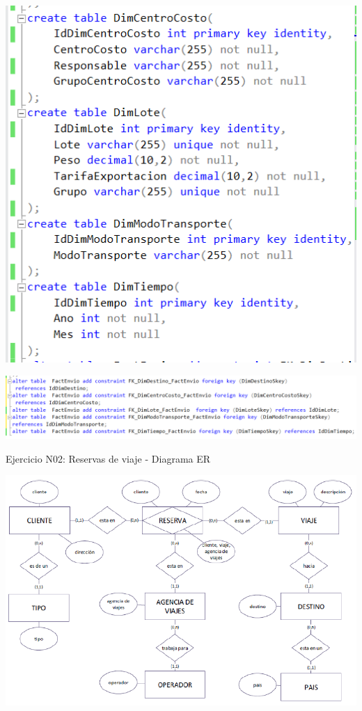 \documentclass[12pt,letterpaper]{article}
\begin{document}
\begin{center}
\includegraphics[width=17cm]{IMG/sql1-2.png} 
\end{center}
 \newpage
\begin{center}
\includegraphics[width=18cm]{IMG/sql1-3.png} 
\end{center}
 \newpage

Ejercicio N02:  Reservas de viaje - Diagrama ER

\begin{center}
\includegraphics[width=17cm]{IMG/er2.png} 
\end{center}
\end{document}
